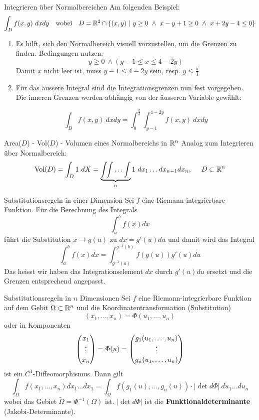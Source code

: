 \begin{Rezept}{Integrieren über Normalbereichen}{}
Am folgenden Beispiel:
\[ \int_D f(x, y) ~ dx dy ~~ \text{ wobei } ~~ D = \mathbb{R}^2 \cap \{(x, y) ~ | ~ y \geq 0 ~ \wedge ~ x-y+1\geq 0 ~ \wedge ~ x+2y-4 \leq 0\}\]
\begin{enumerate}
\item {
Es hilft, sich den Normalbereich visuell vorzustellen, um die Grenzen
zu finden. Bedingungen nutzen:
\[ y \geq 0 ~ \wedge (y-1 \leq x \leq 4-2y) \]
Damit $x$ nicht leer ist, muss $y-1 \leq 4-2y$ sein, resp. $y \leq \frac{5}{3}$ 
}
\item {
Für das äussere Integral sind die Integrationsgrenzen nun fest vorgegeben. Die inneren Grenzen
werden abhängig von der äusseren Variable gewählt:

\[ \int_D f(x,y) ~ dx dy = \int_0^{\frac{5}{3}} \int_{y-1}^{4-2y} f(x,y) ~ dx dy \]

}
\end{enumerate}
\end{Rezept}

\begin{Rezept}{Area($D$) - Vol($D$) - Volumen eines Normalbereichs in $\mathbb{R}^n$}{}
Analog zum Integrieren über Normalbereich:
\[ \text{Vol}(D) = \int_D 1 ~ dX = \underbrace{\int \!\! \int \ldots \int}_{n} 1 ~ dx_1 \ldots dx_{n-1} dx_n,
  ~~~~ D \subset \mathbb{R}^n\]
\end{Rezept}



\begin{Satz}{Substitutionsregeln in einer Dimension}{}
    Sei $f$ eine Riemann-integrierbare Funktion. Für die Berechnung des Integrals
    \[
        \int_a^b f(x) dx
    \]
    führt die Substitution $x \to g(u)$ zu $dx = g'(u)du$ und damit wird das Integral
    \[
        \int_a^b f(x) dx = \int_{g^{-1}(a)}^{g^{-1}(b)} f(g(u)) g'(u) du
    \]
    Das heisst wir haben das Integrationselement $dx$ durch $g'(u)du$ ersetzt und die Grenzen entsprechend angepasst.
\end{Satz}

\begin{Satz}{Substitutionsregeln in $n$ Dimensionen}{}
    Sei $f$ eine Riemann-integrierbare Funktion auf dem Gebit $\Omega \subset \mathbb{R}^n$ und die Koordinatentransformation (Substitution)
    \[
    (x_1,\hdots,x_n) = \Phi(u_1, \hdots,  u_n)
    \]
    oder in Komponenten
    \[
        \begin{pmatrix} x_1 \\ \vdots \\ x_n \end{pmatrix}
        = \Phi(u)
        = \begin{pmatrix} g_1(u_1,\hdots,u_n) \\ \vdots \\ g_n(u_1,\hdots,u_n) \end{pmatrix}
    \]
    ist ein $C^1$-Diffeomorphismus. Dann gilt
    \[
        \int_\Omega f(x_1, \hdots, x_n)dx_1\hdots dx_1 = \int_{\widetilde{\Omega}} f(g_1(u), \hdots, g_n(u)) \cdot |\det d \Phi|\ du_1\hdots du_n
    \]
    wobei das Gebiet $\widetilde{\Omega} = \Phi^{-1}(\Omega)$ ist. $|\det d\Phi|$ ist die \textbf{Funktionaldeterminante} (Jakobi-Determinante).
\end{Satz}

